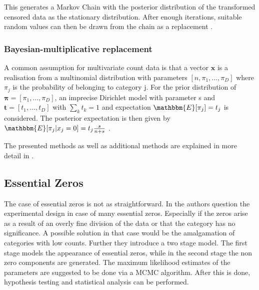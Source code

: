 This generates a Markov Chain with the posterior distribution of the transformed censored data as the stationary distribution. After enough iterations, suitable random values can then be drawn from the chain as a replacement \cite{Palarea-Albaladejo:2015}.


\subsubsection{Bayesian-multiplicative replacement}
\label{sec:Bayesian-multiplicative replacement}

A common assumption for multivariate count data is that a vector $\bm{x}$ is a realisation from a multinomial distribution with parameters $[n,\pi_1,\ldots,\pi_D]$ where $\pi_j$ is the probability of belonging to category j. For the prior distribution of $\bm{\pi}=[\pi_1,\ldots,\pi_D]$, an imprecise Dirichlet model with parameter s and $\bm{t}=[t_1,\ldots,t_D]$ with $\sum_k t_k=1$ and expectation $\mathbbm{E}[\pi_j]=t_j$ is considered. The posterior expectation is then given by $\mathbbm{E}[\pi_j|x_j=0]=t_j \frac{s}{n+s}$ \cite{Palarea-Albaladejo:2015}.


The presented methods as well as additional methods are explained in more detail in \cite{Palarea-Albaladejo:2015}.

\subsection{Essential Zeros}
\label{sec: Essential Zeros}

The case of essential zeros is not as straightforward. In \cite{Aitchison:2003} the authors question the experimental design in case of many essential zeros. Especially if the zeros arise as a result of an overly fine division of the data or that the category has no significance. A possible solution in that case would be the amalgamation of categories with low counts. Further they introduce a two stage model. The first stage models the appearance of essential zeros, while in the second stage the non zero components are generated. The maximum likelihood estimates of the parameters are suggested to be done via a MCMC algorithm. After this is done, hypothesis testing and statistical analysis can be performed. 

